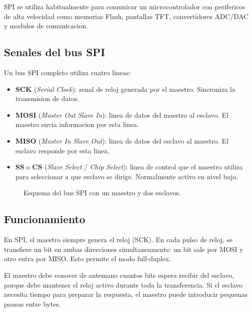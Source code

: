 SPI se utiliza habitualmente para comunicar un microcontrolador con perifericos
de alta velocidad como memorias Flash, pantallas TFT, convertidores ADC/DAC y
modulos de comunicacion.

\subsection{Senales del bus SPI}

Un bus SPI completo utiliza cuatro lineas:

\begin{itemize}
    \item \textbf{SCK} (\textit{Serial Clock}): senal de reloj generada por el
    maestro. Sincroniza la transmision de datos.
    \item \textbf{MOSI} (\textit{Master Out Slave In}): linea de datos del
    maestro al esclavo. El maestro envia informacion por esta linea.
    \item \textbf{MISO} (\textit{Master In Slave Out}): linea de datos del
    esclavo al maestro. El esclavo responde por esta linea.
    \item \textbf{SS} o \textbf{CS} (\textit{Slave Select} / \textit{Chip
    Select}): linea de control que el maestro utiliza para seleccionar a que
    esclavo se dirige. Normalmente activa en nivel bajo.
\end{itemize}

\begin{figure}[H]
    \centering
    \caption{Esquema del bus SPI con un maestro y dos esclavos.}
    \label{fig:spi_esquema}
\end{figure}

\subsection{Funcionamiento}

En SPI, el maestro siempre genera el reloj (SCK). En cada pulso de reloj, se
transfiere un bit en ambas direcciones simultaneamente: un bit sale por MOSI
y otro entra por MISO. Esto permite el modo full-duplex.

El maestro debe conocer de antemano cuantos bits espera recibir del esclavo,
porque debe mantener el reloj activo durante toda la transferencia. Si el esclavo
necesita tiempo para preparar la respuesta, el maestro puede introducir
pequenas pausas entre bytes.

